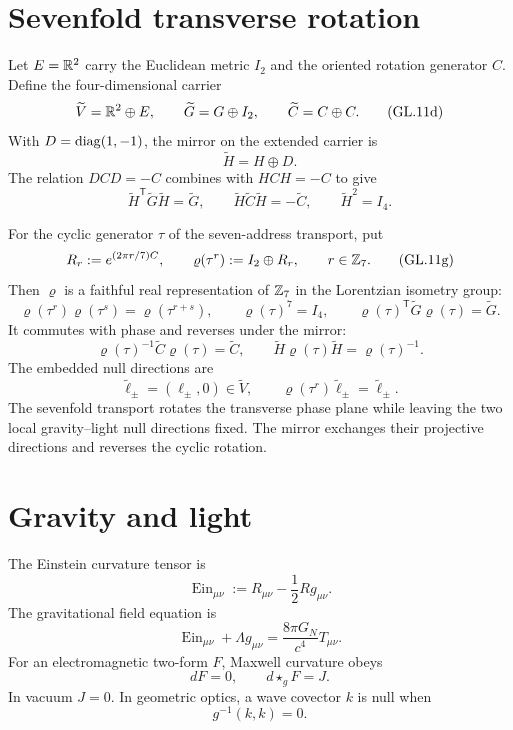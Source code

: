 \documentclass[10pt]{article}
\begin{document}
\section{Sevenfold transverse rotation}

Let $E=\mathbb R^2$ carry the Euclidean metric $I_2$ and the oriented rotation
generator $C$. Define the four-dimensional carrier
\[
\widetilde V=\mathbb R^2\oplus E,
\qquad
\widetilde G=G\oplus I_2,
\qquad
\widetilde C=C\oplus C.
\tag{GL.11d}
\]
With $D=\operatorname{diag}(1,-1)$, the mirror on the extended carrier is
\[
\widetilde H=H\oplus D.
\tag{GL.11e}
\]
The relation $DCD=-C$ combines with $HCH=-C$ to give
\[
\widetilde H^{\mathsf T}\widetilde G\widetilde H=\widetilde G,
\qquad
\widetilde H\widetilde C\widetilde H=-\widetilde C,
\qquad
\widetilde H^2=I_4.
\tag{GL.11f}
\]

For the cyclic generator $\tau$ of the seven-address transport, put
\[
R_r:=e^{(2\pi r/7)C},
\qquad
\varrho(\tau^r):=I_2\oplus R_r,
\qquad r\in\mathbb Z_7.
\tag{GL.11g}
\]
Then $\varrho$ is a faithful real representation of $\mathbb Z_7$ in the Lorentzian
isometry group:
\[
\varrho(\tau^r)\varrho(\tau^s)=\varrho(\tau^{r+s}),
\qquad
\varrho(\tau)^7=I_4,
\qquad
\varrho(\tau)^{\mathsf T}\widetilde G\varrho(\tau)=\widetilde G.
\tag{GL.11h}
\]
It commutes with phase and reverses under the mirror:
\[
\varrho(\tau)^{-1}\widetilde C\varrho(\tau)=\widetilde C,
\qquad
\widetilde H\varrho(\tau)\widetilde H=\varrho(\tau)^{-1}.
\tag{GL.11i}
\]
The embedded null directions are
\[
\widetilde\ell_\pm=(\ell_\pm,0)\in\widetilde V,
\qquad
\varrho(\tau^r)\widetilde\ell_\pm=\widetilde\ell_\pm.
\tag{GL.11j}
\]
The sevenfold transport rotates the transverse phase plane while leaving the
two local gravity--light null directions fixed. The mirror exchanges their
projective directions and reverses the cyclic rotation.

\section{Gravity and light}

The Einstein curvature tensor is
\[
\operatorname{Ein}_{\mu\nu}:=R_{\mu\nu}-\frac12R g_{\mu\nu}.
\tag{GL.12}
\]
The gravitational field equation is
\[
\operatorname{Ein}_{\mu\nu}+\Lambda g_{\mu\nu}
=\frac{8\pi G_N}{c^4}T_{\mu\nu}.
\tag{GL.12a}
\]
For an electromagnetic two-form $F$, Maxwell curvature obeys
\[
dF=0,\qquad d\star_gF=J.
\tag{GL.13}
\]
In vacuum $J=0$. In geometric optics, a wave covector $k$ is null when
\[
g^{-1}(k,k)=0.
\tag{GL.14}
\]
\end{document}

